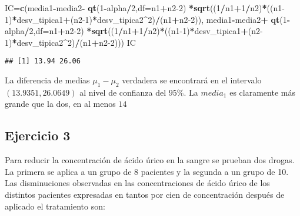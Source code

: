 \documentclass[
]{article}
\newenvironment{Shaded}{\begin{snugshade}}{\end{snugshade}}
\newcommand{\DataTypeTok}[1]{\textcolor[rgb]{0.13,0.29,0.53}{#1}}
\newcommand{\DecValTok}[1]{\textcolor[rgb]{0.00,0.00,0.81}{#1}}
\newcommand{\KeywordTok}[1]{\textcolor[rgb]{0.13,0.29,0.53}{\textbf{#1}}}
\newcommand{\NormalTok}[1]{#1}
\newcommand{\OperatorTok}[1]{\textcolor[rgb]{0.81,0.36,0.00}{\textbf{#1}}}
\newcommand{\StringTok}[1]{\textcolor[rgb]{0.31,0.60,0.02}{#1}}
\begin{document}
\begin{Shaded}
\begin{Highlighting}[]
\NormalTok{IC=}\KeywordTok{c}\NormalTok{(media1}\OperatorTok{{-}}\NormalTok{media2}\OperatorTok{{-}}\StringTok{ }\KeywordTok{qt}\NormalTok{(}\DecValTok{1}\OperatorTok{{-}}\NormalTok{alpha}\OperatorTok{/}\DecValTok{2}\NormalTok{,}\DataTypeTok{df=}\NormalTok{n1}\OperatorTok{+}\NormalTok{n2}\DecValTok{{-}2}\NormalTok{)}
     \OperatorTok{*}\KeywordTok{sqrt}\NormalTok{((}\DecValTok{1}\OperatorTok{/}\NormalTok{n1}\OperatorTok{+}\DecValTok{1}\OperatorTok{/}\NormalTok{n2)}\OperatorTok{*}\NormalTok{((n1}\DecValTok{{-}1}\NormalTok{)}\OperatorTok{*}\NormalTok{desv\_tipica1}\OperatorTok{+}\NormalTok{(n2}\DecValTok{{-}1}\NormalTok{)}\OperatorTok{*}\NormalTok{desv\_tipica2}\OperatorTok{\^{}}\DecValTok{2}\NormalTok{)}\OperatorTok{/}\NormalTok{(n1}\OperatorTok{+}\NormalTok{n2}\DecValTok{{-}2}\NormalTok{)),}
\NormalTok{     media1}\OperatorTok{{-}}\NormalTok{media2}\OperatorTok{+}\StringTok{ }\KeywordTok{qt}\NormalTok{(}\DecValTok{1}\OperatorTok{{-}}\NormalTok{alpha}\OperatorTok{/}\DecValTok{2}\NormalTok{,}\DataTypeTok{df=}\NormalTok{n1}\OperatorTok{+}\NormalTok{n2}\DecValTok{{-}2}\NormalTok{)}
     \OperatorTok{*}\KeywordTok{sqrt}\NormalTok{((}\DecValTok{1}\OperatorTok{/}\NormalTok{n1}\OperatorTok{+}\DecValTok{1}\OperatorTok{/}\NormalTok{n2)}\OperatorTok{*}\NormalTok{((n1}\DecValTok{{-}1}\NormalTok{)}\OperatorTok{*}\NormalTok{desv\_tipica1}\OperatorTok{+}\NormalTok{(n2}\DecValTok{{-}1}\NormalTok{)}\OperatorTok{*}\NormalTok{desv\_tipica2}\OperatorTok{\^{}}\DecValTok{2}\NormalTok{)}\OperatorTok{/}\NormalTok{(n1}\OperatorTok{+}\NormalTok{n2}\DecValTok{{-}2}\NormalTok{)))}
\NormalTok{IC}
\end{Highlighting}
\end{Shaded}

\begin{verbatim}
## [1] 13.94 26.06
\end{verbatim}

La diferencia de medias \(\mu_1-\mu_2\) verdadera se encontrará en el
intervalo \((13.9351, 26.0649)\) al nivel de confianza del \(95\%\). La
\(media_1\) es claramente más grande que la dos, en al menos \(14\)

\hypertarget{ejercicio-3}{%
\subsection{Ejercicio 3}\label{ejercicio-3}}

Para reducir la concentración de ácido úrico en la sangre se prueban dos
drogas. La primera se aplica a un grupo de 8 pacientes y la segunda a un
grupo de 10. Las disminuciones observadas en las concentraciones de
ácido úrico de los distintos pacientes expresadas en tantos por cien de
concentración después de aplicado el tratamiento son:
\end{document}
